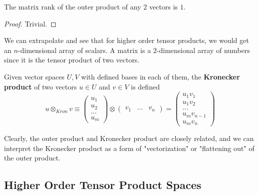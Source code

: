   \begin{proposition}
  The matrix rank of the outer product of any 2 vectors is $1$. 
  \end{proposition}
  \begin{proof}
  Trivial.
  \end{proof}

  We can extrapolate and see that for higher order tensor products, we would get an $n$-dimensional array of scalars. A matrix is a $2$-dimensional array of numbers since it is the tensor product of two vectors. 

  \begin{definition}
  Given vector spaces $U, V$ with defined bases in each of them, the \textbf{Kronecker product} of two vectors $u \in U$ and $v \in V$ is defined
  \[u \otimes_{Kron} v \equiv \begin{pmatrix}
  u_1 \\ u_2 \\ ... \\ u_m
  \end{pmatrix} \otimes \begin{pmatrix}
  v_1 & ... & v_n
  \end{pmatrix} = \begin{pmatrix}
  u_1 v_1 \\ u_1 v_2 \\ ... \\ u_m v_{n-1} \\ u_m v_n 
  \end{pmatrix}\]
  \end{definition}

  Clearly, the outer product and Kronecker product are closely related, and we can interpret the Kronecker product as a form of "vectorization" or "flattening out" of the outer product. 

\subsection{Higher Order Tensor Product Spaces}

